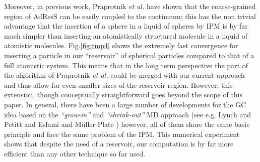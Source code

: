 \documentclass[aip,jcp,a4paper,reprint,onecolumn]{revtex4-1}
\newcommand{\redc}[1]{{\color{red} #1}}
\begin{document}
\redc{Moreover, in previous work, Praprotnik {\it et al.} \cite{delgado2009coupling} have shown that the coarse-grained region of AdResS can be easily coupled to the continuum; this has the non trivial advantage that the insertion of a sphere in a liquid of spheres by IPM is by far much simpler than inserting an atomistically structured molecule in a liquid of atomistic molecules. Fig.\ref{fig:tmp4} shows the extremely fast convergence for inserting a particle in our ``reservoir'' of spherical particles compared to that of a full atomistic system. This means that in the long term perspective the part of the algorithm of Praprotnik {\it et al.} could be merged with our current approach and thus allow for even smaller sizes of the reservoir region. However, this extension, though conceptually straightforward goes beyond the scope of this paper. In general, there have been a large number of developments for the GC idea based on the {\it ``grow-in''} and {\it ``shrink-out''} MD approach (see e.g. Lynch and Petitt \cite{pet5} and Eslami and M\"uller-Plate \cite{flo}) however, all of them  share the same basic principle and face the same problem of the IPM. This numerical experiment shows that despite the need of a reservoir, our computation is by far more efficient than any other technique so far used.}
 
\end{document}
